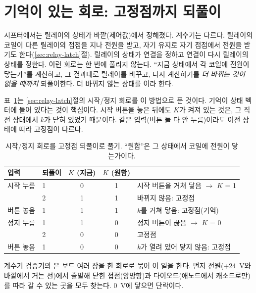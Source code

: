 \section{기억이 있는 회로: 고정점까지 되풀이}\label{sec:v-fixpoint}

\Why 시프터에서는 릴레이의 상태가 바깥(제어값)에서 정해졌다. 계수기는 다르다. 릴레이의 코일이 다른 릴레이의
접점을 지나 전원을 받고, 자기 유지로 자기 접점에서 전원을 받기도 한다(\ref{sec:relay-latch}절). 릴레이의 상태가
연결을 정하고 연결이 다시 릴레이의 상태를 정한다. 이런 회로는 한 번에 풀리지 않는다. ``지금 상태에서 각 코일에
전원이 닿는가''를 계산하고, 그 결과대로 릴레이를 바꾸고, 다시 계산하기를 \emph{더 바뀌는 것이 없을 때까지}
되풀이한다. 더 바뀌지 않는 상태를 이라 한다.

\General 표~\ref{tab:v-fix}는 \ref{sec:relay-latch}절의 시작/정지 회로를 이 방법으로 푼 것이다. 기억이 상태
벡터에 들어 있다는 것이 핵심이다. 시작 버튼을 놓은 뒤에도 $K$가 켜져 있는 것은, 그 직전 상태에서 $k$가 닫혀
있었기 때문이다. 같은 입력(버튼 둘 다 안 누름)이라도 이전 상태에 따라 고정점이 다르다.

\begin{table}[ht]
\centering
\caption{시작/정지 회로를 고정점 되풀이로 풀기. ``원함''은 그 상태에서 코일에 전원이 닿는가이다.}
\label{tab:v-fix}
\small
\begin{tabular}{llccl}
\toprule
입력 & 되풀이 & $K$ (지금) & $K$ (원함) & \\
\midrule
시작 누름 & 1 & 0 & 1 & 시작 버튼을 거쳐 닿음 $\to$ $K$ = 1 \\
          & 2 & 1 & 1 & 바뀌지 않음: 고정점 \\
버튼 놓음 & 1 & 1 & 1 & $k$를 거쳐 닿음: 고정점(기억) \\
정지 누름 & 1 & 1 & 0 & 정지 버튼이 끊음 $\to$ $K$ = 0 \\
          & 2 & 0 & 0 & 고정점 \\
버튼 놓음 & 1 & 0 & 0 & $k$가 열려 있어 닿지 않음: 고정점 \\
\bottomrule
\end{tabular}
\end{table}

\Ours 계수기 검증기의 은 보드 여러 장을 한 회로로 묶어 이 일을 한다. 먼저 전원(+24~V와 바깥에서 거는
선)에서 출발해 닫힌 접점(양방향)과 다이오드(애노드에서 캐소드로만)를 따라 갈 수 있는 곳을 모두 찾는다. 0~V에
닿으면 단락이다.


